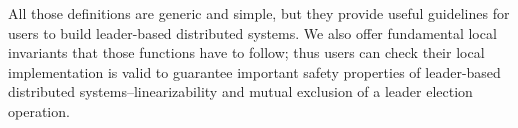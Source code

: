 All those definitions are generic and simple, but they provide useful guidelines for users to build leader-based distributed systems. We also offer fundamental local invariants that those functions have to follow; thus users can check their local implementation is valid to guarantee important safety properties of leader-based distributed systems--linearizability and mutual exclusion of a leader election operation.